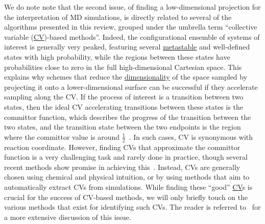 \documentclass[9pt,review]{livecoms}
\begin{document}
We do note note that the second issue, of finding a low-dimensional projection for the interpretation of MD simulations, is directly related to several of the algorithms presented in this review, grouped under the umbrella term ``collective variable (\hyperlink{ref:CV} {CV})-based methods''. Indeed, the configurational ensemble of systems of interest is generally very peaked, featuring several \hyperlink{ref:metastab} {metastable} and well-defined states with high probability, while the regions between these states have probabilities close to zero in the full high-dimensional Cartesian space. This explains why schemes that reduce the \hyperlink{ref:DimRed} {dimensionality} of the space sampled by projecting it onto a lower-dimensional surface can be successful if they accelerate sampling along the CV.
If the process of interest is a transition between two states, then the ideal CV accelerating transitions between these states is the committor function, which describes the progress of the transition between the two states, and the transition state between the two endpoints is the region where the committor value is around $\frac{1}{2}$~\cite{doi:10.1146/annurev.physchem.53.082301.113146,LiMa_2014,BaronPeters_RC_ARPC_2015,BanushkinaKrivov_2016,Tuckerman2010}. In such cases, CV is synonymous with reaction coordinate. However, finding CVs that approximate the committor function is a very challenging task and rarely done in practice, though several recent methods show promise in achieving this~\cite{LiLinRen_2019,MoriMatubayasi_2020,PalacioRodriguez_Pietrucci_2022,JungHummer_2021,FrassekBolhuis_2021,WuMa_2022}. Instead, CVs are generally chosen using chemical and physical intuition, or by using methods that aim to automatically extract CVs from simulations. While finding these ``good'' \hyperlink{ref:CV} {CV}s is crucial for the success of CV-based methods, we will only briefly touch on the various methods that exist for identifying such CVs. The reader is referred to~\cite{WANG2020139, doi:10.1080/00268976.2020.1737742, doi:10.1021/acs.jctc.0c00355} for a more extensive discussion of this issue.
\end{document}
